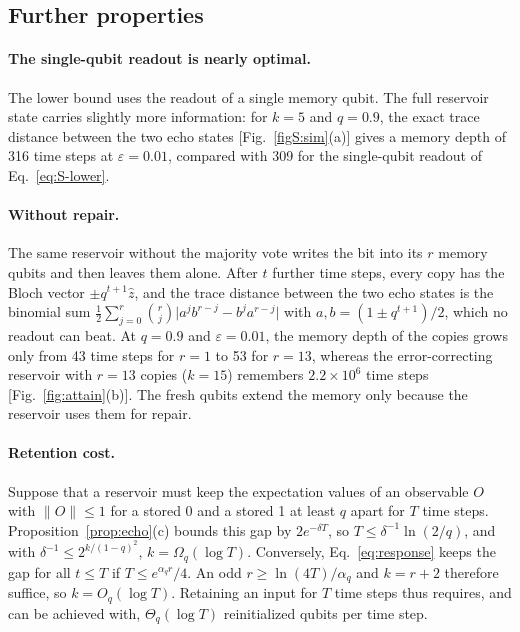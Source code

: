 \documentclass[aps,prl,twocolumn,superscriptaddress,floatfix]{revtex4-2}
\theoremstyle{plain}
\newcommand{\Norm}[1]{\lVert #1\rVert}
\begin{document}
\subsection{Further properties}

\paragraph*{The single-qubit readout is nearly optimal.} The lower bound uses the readout of a single memory qubit. The full reservoir state carries slightly more information: for $k=5$ and $q=0.9$, the exact trace distance between the two echo states [Fig.~\ref{figS:sim}(a)] gives a memory depth of 316 time steps at $\varepsilon=0.01$, compared with 309 for the single-qubit readout of Eq.~\eqref{eq:S-lower}.

\paragraph*{Without repair.} The same reservoir without the majority vote writes the bit into its $r$ memory qubits and then leaves them alone. After $t$ further time steps, every copy has the Bloch vector $\pm q^{t+1}\hat z$, and the trace distance between the two echo states is the binomial sum $\frac12\sum_{j=0}^{r}\binom rj\bigl|a^jb^{r-j}-b^ja^{r-j}\bigr|$ with $a,b=(1\pm q^{t+1})/2$, which no readout can beat. At $q=0.9$ and $\varepsilon=0.01$, the memory depth of the copies grows only from 43 time steps for $r=1$ to 53 for $r=13$, whereas the error-correcting reservoir with $r=13$ copies ($k=15$) remembers $2.2\times10^6$ time steps [Fig.~\ref{fig:attain}(b)]. The fresh qubits extend the memory only because the reservoir uses them for repair.

\paragraph*{Retention cost.} Suppose that a reservoir must keep the expectation values of an observable $O$ with $\Norm O\le1$ for a stored 0 and a stored 1 at least $q$ apart for $T$ time steps. Proposition~\ref{prop:echo}(c) bounds this gap by $2e^{-\delta T}$, so $T\le\delta^{-1}\ln(2/q)$, and with $\delta^{-1}\le2^{k/(1-q)^2}$, $k=\Omega_q(\log T)$. Conversely, Eq.~\eqref{eq:response} keeps the gap for all $t\le T$ if $T\le e^{\alpha_qr}/4$. An odd $r\ge\ln(4T)/\alpha_q$ and $k=r+2$ therefore suffice, so $k=O_q(\log T)$. Retaining an input for $T$ time steps thus requires, and can be achieved with, $\Theta_q(\log T)$ reinitialized qubits per time step.
\end{document}
